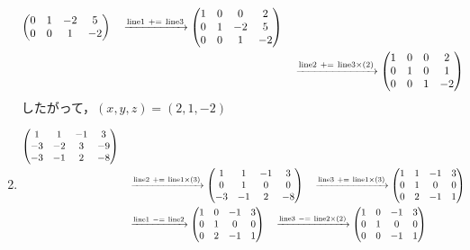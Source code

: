 \documentclass{ltjsarticle}
\begin{document}
\begin{enumerate}
\begin{align*}
\begin{pmatrix}
 0 & 1 & - 2 & 5\\
 0 & 0 & 1 & - 2
\end{pmatrix}\ \ \ \xrightarrow{ \text{line} 1 \ +=\  \text{line} 3 } %
\begin{pmatrix}
 1 & 0 & 0 & 2\\
 0 & 1 & - 2 & 5\\
 0 & 0 & 1 & - 2
\end{pmatrix}\allowdisplaybreaks\\
&\ \ \ \xrightarrow{ \text{line} 2 \ +=\  \text{line} 3 \times\left( 2 \right)} %
\begin{pmatrix}
 1 & 0 & 0 & 2\\
 0 & 1 & 0 & 1\\
 0 & 0 & 1 & - 2
\end{pmatrix}
\end{align*}
したがって，$(x, y, z)=(2, 1, -2)$
\item
\begin{align*}
\begin{pmatrix}
 1 & 1 & -1 & 3\\
 - 3 & - 2 & 3 & - 9\\
 - 3 & -1 & 2 & - 8
\end{pmatrix}\\
 &\ \ \ \xrightarrow{ \text{line} 2 \ +=\  \text{line} 1 \times\left( 3 \right)} %
\begin{pmatrix}
 1 & 1 & -1 & 3\\
 0 & 1 & 0 & 0\\
 - 3 & -1 & 2 & - 8
\end{pmatrix}
 \ \ \ \xrightarrow{ \text{line} 3 \ +=\  \text{line} 1 \times\left( 3 \right)} %
\begin{pmatrix}
 1 & 1 & -1 & 3\\
 0 & 1 & 0 & 0\\
 0 & 2 & -1 & 1
\end{pmatrix}\allowdisplaybreaks\\
 &\ \ \ \xrightarrow{ \text{line} 1 \ -=\  \text{line} 2 } %
\begin{pmatrix}
 1 & 0 & -1 & 3\\
 0 & 1 & 0 & 0\\
 0 & 2 & -1 & 1
\end{pmatrix}
 \ \ \ \xrightarrow{ \text{line} 3 \ -=\  \text{line} 2 \times\left( 2 \right)} %
\begin{pmatrix}
 1 & 0 & -1 & 3\\
 0 & 1 & 0 & 0\\
 0 & 0 & -1 & 1
\end{pmatrix}\allowdisplaybreaks\\

\end{align*}
\end{enumerate}
\end{document}
